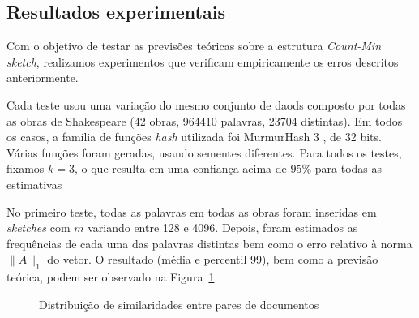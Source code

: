 \subsection{Resultados experimentais}\label{sec:count:experiments}

Com o objetivo de testar as previsões teóricas sobre a estrutura \emph{Count-Min sketch}, realizamos experimentos que verificam empiricamente os erros descritos anteriormente.

Cada teste usou uma variação do mesmo conjunto de daods composto por todas as obras de Shakespeare (42 obras, 964410 palavras, 23704 distintas). Em todos os casos, a família de funções \emph{hash} utilizada foi MurmurHash 3 \cite{appleby2012murmur}, de 32 bits. Várias funções foram geradas, usando sementes diferentes. Para todos os testes, fixamos $k=3$, o que resulta em uma confiança acima de 95\% para todas as estimativas

No primeiro teste, todas as palavras em todas as obras foram inseridas em \emph{sketches} com $m$ variando entre 128 e 4096. Depois, foram estimados as frequências de cada uma das palavras distintas bem como o erro relativo à norma $\lVert A \rVert_1$ do vetor. O resultado (média e percentil 99), bem como a previsão teórica, podem ser observado na Figura~\ref{fig:countmin_result}.

\begin{figure}[!htbp]
\centering
{}
\caption{Distribuição de similaridades entre pares de documentos}
\label{fig:countmin_result}
\end{figure}

